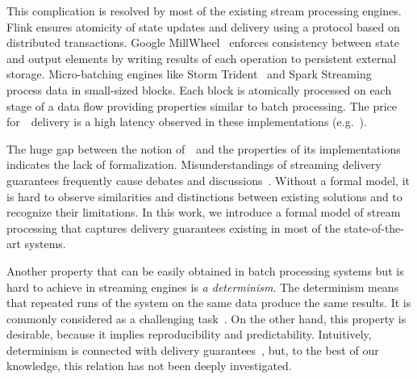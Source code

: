 This complication is resolved  by most of the existing stream processing engines. 
Flink ensures atomicity of  state updates and   delivery using a protocol based on distributed transactions. 
Google MillWheel~\cite{Akidau:2013:MFS:2536222.2536229} enforces consistency between state and output elements by writing results of each operation to persistent external storage. 
Micro-batching engines like Storm Trident~\cite{apache:storm:trident} and Spark Streaming~\cite{Zaharia:2012:DSE:2342763.2342773} process data in small-sized blocks. 
Each block is atomically processed on each stage of a data flow  providing properties similar to batch processing. 
The price for~\eo\ delivery is a high latency  observed in these implementations (e.g.~\cite{7530084, 7474816}).


The huge gap between the notion of~\eo\ and the properties of its implementations indicates the lack of formalization. 
Misunderstandings of streaming delivery guarantees frequently cause debates and discussions~\cite{JerryPengStreamIO, PaperTrail}. Without a formal model, it is hard to observe similarities and distinctions between existing solutions and to recognize their limitations. In this work, we introduce a formal model of stream processing that captures delivery guarantees existing in most of the state-of-the-art systems.

Another property that can be easily obtained in batch processing systems but is hard to achieve in streaming engines is {\em a determinism}. 
The determinism means that repeated runs of the system on the same data produce the same results. It is commonly considered as a challenging task~\cite{Zacheilas:2017:MDS:3093742.3093921}. On the other hand, this property is desirable, because it implies reproducibility and predictability. Intuitively, determinism is connected with delivery guarantees~\cite{Stonebraker:2005:RRS:1107499.1107504}, but, to the best of our knowledge, this relation has not been deeply investigated. 


